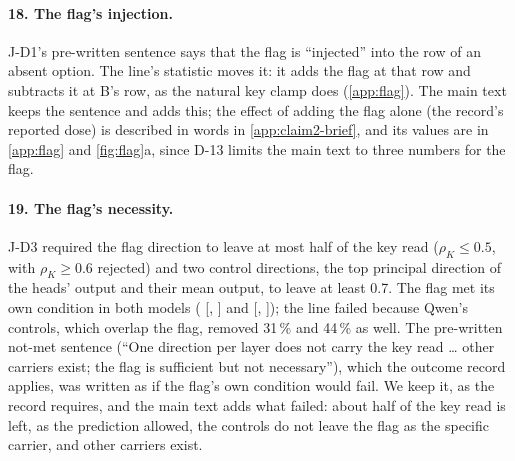 \paragraph{18. The flag's injection.} J-D1's pre-written sentence says that the flag is ``injected'' into the row of an absent option. The line's statistic moves it: it adds the flag at that row and subtracts it at B's row, as the natural key clamp does (\cref{app:flag}). The main text keeps the sentence and adds this; the effect of adding the flag alone (the record's reported dose) is described in words in \cref{app:claim2-brief}, and its values are in \cref{app:flag} and \cref{fig:flag}a, since D-13 limits the main text to three numbers for the flag.

\paragraph{19. The flag's necessity.} J-D3 required the flag direction to leave at most half of the key read ($\rho_K \leq 0.5$, with $\rho_K \geq 0.6$ rejected) and two control directions, the top principal direction of the heads' output and their mean output, to leave at least 0.7. The flag met its own condition in both models (\JdThreeRhoFlagQwenSeven{} [\JdThreeRhoFlagQwenSevenLo{}, \JdThreeRhoFlagQwenSevenHi{}] and \JdThreeRhoFlagMistralSeven{} [\JdThreeRhoFlagMistralSevenLo{}, \JdThreeRhoFlagMistralSevenHi{}]); the line failed because Qwen's controls, which overlap the flag, removed 31\,\% and 44\,\% as well. The pre-written not-met sentence (``One direction per layer does not carry the key read \ldots{} other carriers exist; the flag is sufficient but not necessary''), which the outcome record applies, was written as if the flag's own condition would fail. We keep it, as the record requires, and the main text adds what failed: about half of the key read is left, as the prediction allowed, the controls do not leave the flag as the specific carrier, and other carriers exist. %

